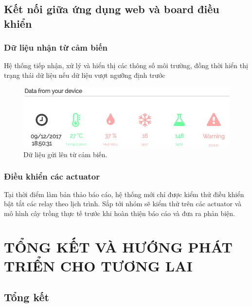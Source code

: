\documentclass[a4paper,12pt,oneside]{article}
\begin{document}
\subsection{Kết nối giữa ứng dụng web và board điều khiển}

\subsubsection{Dữ liệu nhận từ cảm biến}
\noindent Hệ thống tiếp nhận, xử lý và hiển thị các thông số môi trường, đồng thời hiển thị trạng thái dữ liệu nếu dữ liệu vượt ngưỡng định trước

	\begin{figure}[H]
	\begin{center}
	\includegraphics[scale=.7]{hinh/data.PNG}
	\end{center}
	\caption{Dữ liệu gửi lên từ cảm biến.}
	\end{figure}
\subsubsection{Điều khiển các actuator}
\noindent Tại thời điểm làm bản thảo báo cáo, hệ thống mới chỉ được kiểm thử điều khiển bật tắt các relay theo lịch trình. Sắp tới nhóm sẽ kiểm thử trên các actuator và mô hình cây trồng thực tế trước khi hoàn thiện báo cáo và đưa ra phản biện.

\newpage
\section{TỔNG KẾT VÀ HƯỚNG PHÁT TRIỂN CHO TƯƠNG LAI}
\subsection{Tổng kết}
\end{document}
